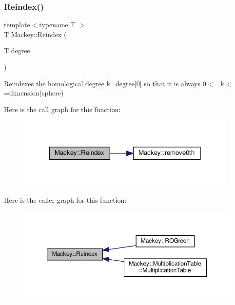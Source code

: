 \subsubsection{\texorpdfstring{Reindex()}{Reindex()}\hspace{0.1cm}{\footnotesize\ttfamily [1/2]}}
{\footnotesize\ttfamily template$<$typename T $>$ \\
T Mackey\+::\+Reindex (\begin{DoxyParamCaption}\item[{T}]{degree }\end{DoxyParamCaption})\hspace{0.3cm}{\ttfamily [inline]}}



Reindexes the homological degree k=degree\mbox{[}0\mbox{]} so that it is always 0$<$=k$<$=dimension(sphere) 

Here is the call graph for this function\+:\nopagebreak
\begin{figure}[H]
\begin{center}
\leavevmode
\includegraphics[width=312pt]{namespaceMackey_a7da73ade3ee83c4ffd614e79242d7c04_cgraph}
\end{center}
\end{figure}
Here is the caller graph for this function\+:\nopagebreak
\begin{figure}[H]
\begin{center}
\leavevmode
\includegraphics[width=347pt]{namespaceMackey_a7da73ade3ee83c4ffd614e79242d7c04_icgraph}
\end{center}
\end{figure}
\mbox{\label{namespaceMackey_acb84c147d9ee39eac2883a762e3710dd}} 

